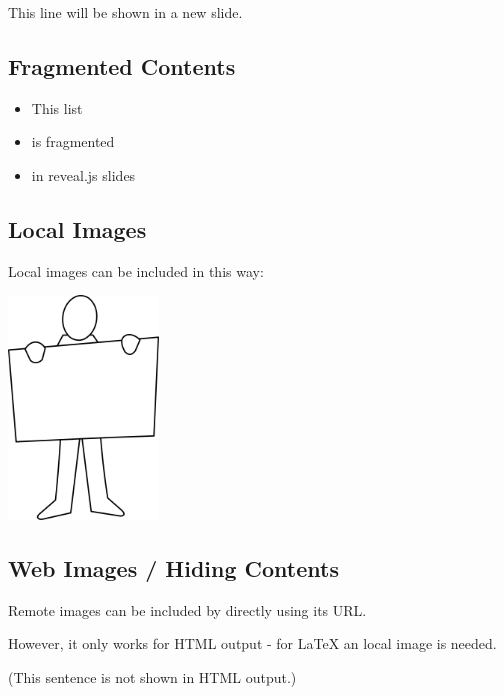 \documentclass[10pt,article]{article}
\begin{document}
This line will be shown in a new slide.
\subsection{Fragmented Contents}
\label{sec:org6b0e999}
\begin{itemize}
\item This list
\item is fragmented
\item in reveal.js slides
\end{itemize}
\subsection{Local Images}
\label{sec:orgc3748cd}
Local images can be included in this way:

\begin{center}
\includegraphics[width=4cm]{../../../Assets/Images/Misc/affiche.png}
\end{center}

\subsection{Web Images / Hiding Contents}
\label{sec:orgd43f256}
Remote images can be included by directly using its URL. 

However, it only works for HTML output - for \LaTeX{} an local image is needed.

(This sentence is not shown in HTML output.)
\end{document}
